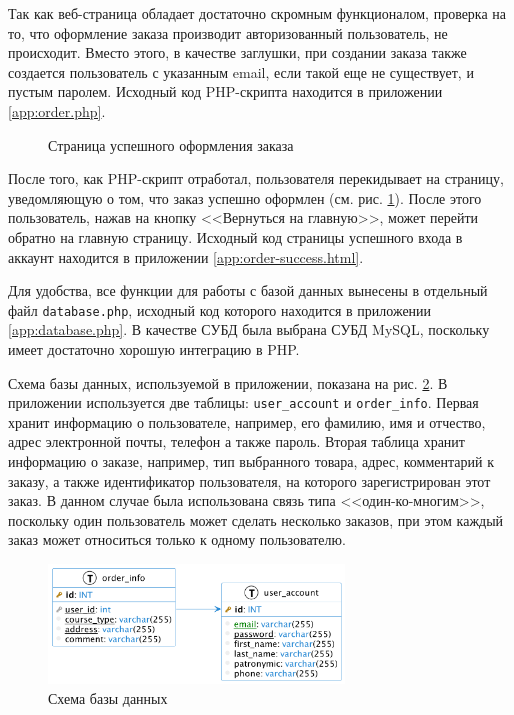\documentclass[a4paper, 14pt]{extarticle}
\begin{document}
Так как веб-страница обладает достаточно скромным функционалом, проверка на то,
что оформление заказа производит авторизованный пользователь, не происходит.
Вместо этого, в качестве заглушки, при создании заказа также создается
пользователь с указанным email, если такой еще не существует, и пустым паролем.
Исходный код PHP-скрипта находится в приложении \ref{app:order.php}.

\begin{figure}[H]
  \centering
  \caption{Страница успешного оформления заказа}
  \label{fig:order-success.html}
\end{figure}

После того, как PHP-скрипт отработал, пользователя перекидывает на страницу,
уведомляющую о том, что заказ успешно оформлен (см. рис.
\ref{fig:order-success.html}). После этого пользователь, нажав на кнопку
<<Вернуться на главную>>, может перейти обратно на главную страницу. Исходный
код страницы успешного входа в аккаунт находится в приложении
\ref{app:order-success.html}.

Для удобства, все функции для работы с базой данных вынесены в отдельный файл
\texttt{database.php}, исходный код которого находится в приложении
\ref{app:database.php}. В качестве СУБД была выбрана СУБД MySQL, поскольку имеет
достаточно хорошую интеграцию в PHP.

Схема базы данных, используемой в приложении, показана на рис.
\ref{fig:puml/database.png}. В приложении используется две таблицы:
\texttt{user\_account} и \texttt{order\_info}. Первая хранит информацию о
пользователе, например, его фамилию, имя и отчество, адрес электронной почты,
телефон а также пароль. Вторая таблица хранит информацию о заказе, например, тип
выбранного товара, адрес, комментарий к заказу, а также идентификатор
пользователя, на которого зарегистрирован этот заказ. В данном случае была
использована связь типа <<один-ко-многим>>, поскольку один пользователь может
сделать несколько заказов, при этом каждый заказ может относиться только к
одному пользователю.

\begin{figure}[H]
  \centering
  \includegraphics[width=0.7\textwidth]{images/puml/database.png}
  \caption{Схема базы данных}
  \label{fig:puml/database.png}
\end{figure}
\end{document}
